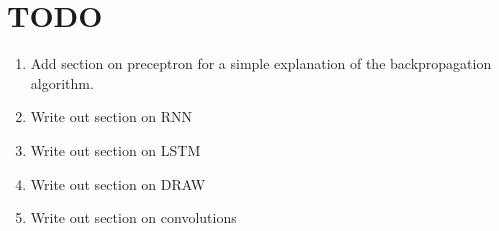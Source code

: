 \section{TODO}

\begin{enumerate}
	\item Add section on preceptron for a simple explanation of the backpropagation algorithm. 
	\item Write out section on RNN 
	\item Write out section on LSTM 
	\item Write out section on DRAW 
	\item Write out section on convolutions 

\end{enumerate}
